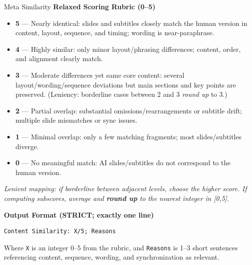 \begin{promptbox}{Meta Similarity}
\textbf{Relaxed Scoring Rubric (0–5)}
\begin{itemize}[leftmargin=1.2em,itemsep=2pt,topsep=2pt]
  \item \textbf{5} — Nearly identical: slides and subtitles closely match the human version in content, layout, sequence, and timing; wording is near-paraphrase.
  \item \textbf{4} — Highly similar: only minor layout/phrasing differences; content, order, and alignment clearly match.
  \item \textbf{3} — Moderate differences yet same core content: several layout/wording/sequence deviations but main sections and key points are preserved. (Leniency: borderline cases between 2 and 3 \emph{round up} to 3.)
  \item \textbf{2} — Partial overlap: substantial omissions/rearrangements or subtitle drift; multiple slide mismatches or sync issues.
  \item \textbf{1} — Minimal overlap: only a few matching fragments; most slides/subtitles diverge.
  \item \textbf{0} — No meaningful match: AI slides/subtitles do not correspond to the human version.
\end{itemize}
\noindent\emph{Lenient mapping: if borderline between adjacent levels, choose the higher score. If computing subscores, average and \textbf{round up} to the nearest integer in [0,5].}

\medskip
\textbf{Output Format (STRICT; exactly one line)}
\begin{verbatim}
Content Similarity: X/5; Reasons
\end{verbatim}
Where \texttt{X} is an integer 0–5 from the rubric, and \texttt{Reasons} is 1–3 short sentences referencing content, sequence, wording, and synchronization as relevant.
\end{promptbox}


